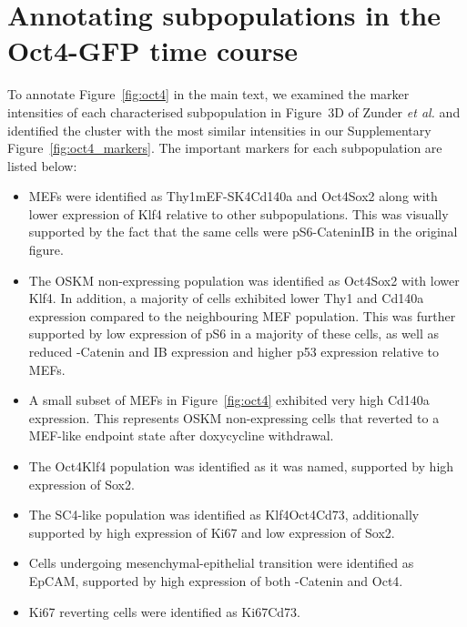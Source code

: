 \documentclass{article}
\begin{document}
\section{Annotating subpopulations in the Oct4-GFP time course}
To annotate Figure~\ref{fig:oct4} in the main text, we examined the marker intensities of each characterised subpopulation in Figure~3D of Zunder \emph{et al.} \cite{zunder2015continuous} and identified the cluster with the most similar intensities in our Supplementary Figure~\ref{fig:oct4_markers}.
The important markers for each subpopulation are listed below:
\begin{itemize}
    \item MEFs were identified as Thy1\hi{}mEF-SK4\hi{}Cd140a\hi{} and Oct4\lo{}Sox2\lo{} along with lower expression of Klf4 relative to other subpopulations.
        This was visually supported by the fact that the same cells were pS6\hi{}\textbeta-Catenin\hi{}I\textkappa{}B\textalpha\hi{} in the original figure.
    \item The OSKM non-expressing population was identified as Oct4\lo{}Sox2\lo{} with lower Klf4.
        In addition, a majority of cells exhibited lower Thy1 and Cd140a expression compared to the neighbouring MEF population.
        This was further supported by low expression of pS6 in a majority of these cells, as well as reduced \textbeta-Catenin and I\textkappa{}B\textalpha{} expression and higher p53 expression relative to MEFs.
    \item A small subset of MEFs in Figure~\ref{fig:oct4} exhibited very high Cd140a expression.
This represents OSKM non-expressing cells that reverted to a MEF-like endpoint state after doxycycline withdrawal.
    \item The Oct4\hi{}Klf4\hi{} population was identified as it was named, supported by high expression of Sox2.
    \item The SC4-like population was identified as Klf4\hi{}Oct4\hi{}Cd73\hi{}, additionally supported by high expression of Ki67 and low expression of Sox2.
    \item Cells undergoing mesenchymal-epithelial transition were identified as EpCAM\hi{}, supported by high expression of both \textbeta-Catenin and Oct4.
    \item Ki67\lo{} reverting cells were identified as Ki67\lo{}Cd73\hi{}.

\end{itemize}
\end{document}
